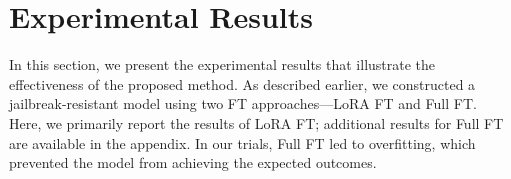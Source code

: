 \documentclass[conference,compsoc]{IEEEtran}
\begin{document}



\section{Experimental Results}

In this section, we present the experimental results that illustrate the effectiveness of the proposed method. As described earlier, we constructed a jailbreak-resistant model using two FT approaches—LoRA FT and Full FT. Here, we primarily report the results of LoRA FT; additional results for Full FT are available in the appendix. 
In our trials, Full FT led to overfitting, which prevented the model from achieving the expected outcomes. 
\end{document}
